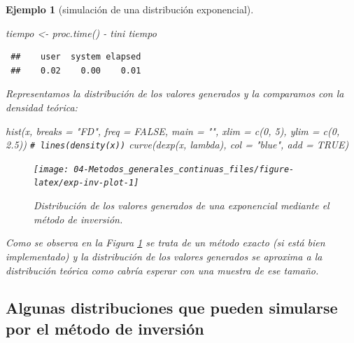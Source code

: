 \documentclass[
  10pt,
]{book}
\newenvironment{Shaded}{\begin{snugshade}}{\end{snugshade}}
\newcommand{\AttributeTok}[1]{\textcolor[rgb]{0.77,0.63,0.00}{#1}}
\newcommand{\CommentTok}[1]{\textcolor[rgb]{0.56,0.35,0.01}{\textit{#1}}}
\newcommand{\ConstantTok}[1]{\textcolor[rgb]{0.00,0.00,0.00}{#1}}
\newcommand{\DecValTok}[1]{\textcolor[rgb]{0.00,0.00,0.81}{#1}}
\newcommand{\FloatTok}[1]{\textcolor[rgb]{0.00,0.00,0.81}{#1}}
\newcommand{\FunctionTok}[1]{\textcolor[rgb]{0.00,0.00,0.00}{#1}}
\newcommand{\NormalTok}[1]{#1}
\newcommand{\OtherTok}[1]{\textcolor[rgb]{0.56,0.35,0.01}{#1}}
\newcommand{\SpecialCharTok}[1]{\textcolor[rgb]{0.00,0.00,0.00}{#1}}
\newcommand{\StringTok}[1]{\textcolor[rgb]{0.31,0.60,0.02}{#1}}
\theoremstyle{break}
\newtheorem{example}{Ejemplo}[chapter]
\theoremstyle{nonumberplain}
\renewcommand{\CommentTok}[1]{\textcolor[rgb]{0.41,0.41,0.41}{\texttt{#1}}}
\begin{document}
\begin{example}[simulación de una distribución exponencial]
\begin{Shaded}
\begin{Highlighting}[]
\NormalTok{tiempo }\OtherTok{\textless{}{-}} \FunctionTok{proc.time}\NormalTok{() }\SpecialCharTok{{-}}\NormalTok{ tini}
\NormalTok{tiempo}
\end{Highlighting}
\end{Shaded}

\begin{verbatim}
 ##    user  system elapsed 
 ##    0.02    0.00    0.01
\end{verbatim}

Representamos la distribución de los valores generados y la comparamos con la densidad teórica:

\begin{Shaded}
\begin{Highlighting}[]
\FunctionTok{hist}\NormalTok{(x, }\AttributeTok{breaks =} \StringTok{"FD"}\NormalTok{, }\AttributeTok{freq =} \ConstantTok{FALSE}\NormalTok{, }
        \AttributeTok{main =} \StringTok{""}\NormalTok{, }\AttributeTok{xlim =} \FunctionTok{c}\NormalTok{(}\DecValTok{0}\NormalTok{, }\DecValTok{5}\NormalTok{), }\AttributeTok{ylim =} \FunctionTok{c}\NormalTok{(}\DecValTok{0}\NormalTok{, }\FloatTok{2.5}\NormalTok{))}
\CommentTok{\# lines(density(x))}
\FunctionTok{curve}\NormalTok{(}\FunctionTok{dexp}\NormalTok{(x, lambda), }\AttributeTok{col =} \StringTok{"blue"}\NormalTok{, }\AttributeTok{add =} \ConstantTok{TRUE}\NormalTok{)}
\end{Highlighting}
\end{Shaded}

\begin{figure}[!htbp]

{\centering \texttt{[image: 04-Metodos\_generales\_continuas\_files/figure-latex/exp-inv-plot-1]} 

}

\caption{Distribución de los valores generados de una exponencial mediante el método de inversión.}\label{fig:exp-inv-plot}
\end{figure}

Como se observa en la Figura \ref{fig:exp-inv-plot} se trata de un método exacto (si está bien implementado) y la distribución de los valores generados se aproxima a la distribución teórica como cabría esperar con una muestra de ese tamaño.
\end{example}

\hypertarget{ejemplos-inv}{%
\subsection{Algunas distribuciones que pueden simularse por el método de inversión}\label{ejemplos-inv}}
\end{document}
